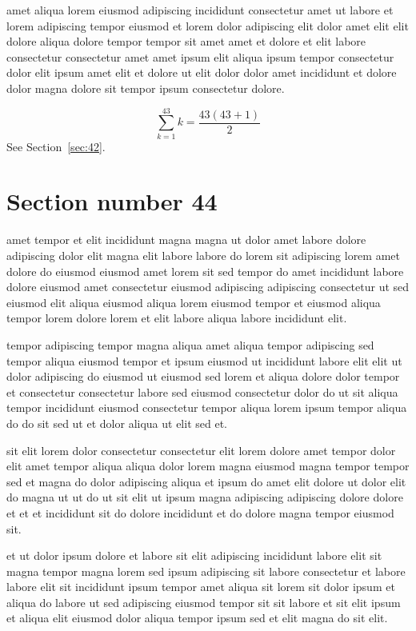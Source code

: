 \documentclass{article}
\begin{document}
amet aliqua lorem eiusmod adipiscing incididunt consectetur amet ut labore et lorem adipiscing tempor eiusmod et lorem dolor adipiscing elit dolor amet elit elit dolore aliqua dolore tempor tempor sit amet amet et dolore et elit labore consectetur consectetur amet amet ipsum elit aliqua ipsum tempor consectetur dolor elit ipsum amet elit et dolore ut elit dolor dolor amet incididunt et dolore dolor magna dolore sit tempor ipsum consectetur dolore.

\begin{equation} \sum_{k=1}^{43} k = \frac{43(43+1)}{2} \end{equation}
See Section~\ref{sec:42}.

\section{Section number 44}\label{sec:44}
amet tempor et elit incididunt magna magna ut dolor amet labore dolore adipiscing dolor elit magna elit labore labore do lorem sit adipiscing lorem amet dolore do eiusmod eiusmod amet lorem sit sed tempor do amet incididunt labore dolore eiusmod amet consectetur eiusmod adipiscing adipiscing consectetur ut sed eiusmod elit aliqua eiusmod aliqua lorem eiusmod tempor et eiusmod aliqua tempor lorem dolore lorem et elit labore aliqua labore incididunt elit.

tempor adipiscing tempor magna aliqua amet aliqua tempor adipiscing sed tempor aliqua eiusmod tempor et ipsum eiusmod ut incididunt labore elit elit ut dolor adipiscing do eiusmod ut eiusmod sed lorem et aliqua dolore dolor tempor et consectetur consectetur labore sed eiusmod consectetur dolor do ut sit aliqua tempor incididunt eiusmod consectetur tempor aliqua lorem ipsum tempor aliqua do do sit sed ut et dolor aliqua ut elit sed et.

sit elit lorem dolor consectetur consectetur elit lorem dolore amet tempor dolor elit amet tempor aliqua aliqua dolor lorem magna eiusmod magna tempor tempor sed et magna do dolor adipiscing aliqua et ipsum do amet elit dolore ut dolor elit do magna ut ut do ut sit elit ut ipsum magna adipiscing adipiscing dolore dolore et et et incididunt sit do dolore incididunt et do dolore magna tempor eiusmod sit.

et ut dolor ipsum dolore et labore sit elit adipiscing incididunt labore elit sit magna tempor magna lorem sed ipsum adipiscing sit labore consectetur et labore labore elit sit incididunt ipsum tempor amet aliqua sit lorem sit dolor ipsum et aliqua do labore ut sed adipiscing eiusmod tempor sit sit labore et sit elit ipsum et aliqua elit eiusmod dolor aliqua tempor ipsum sed et elit magna do sit elit.
\end{document}
